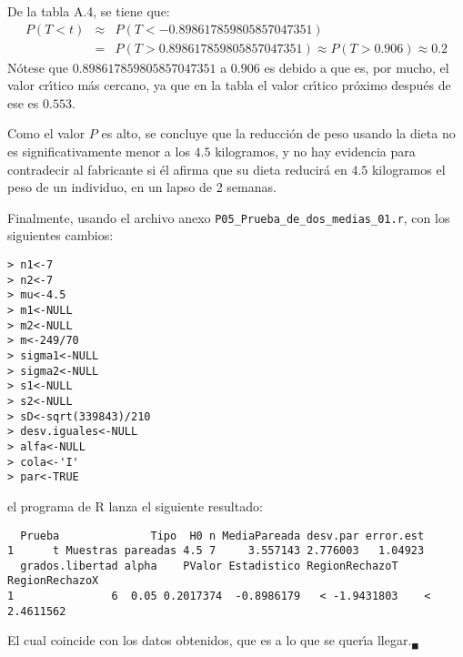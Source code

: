 \begin{solucion}
 \begin{valorp}
  De la tabla A.4, se tiene que:
  \begin{eqnarray*}
   P\left( T < t \right) & \approx & P(T < -0.898617859805857047351)
   \\
   & = & P(T > 0.898617859805857047351)
   \approx P(T>0.906) \approx 0.2
  \end{eqnarray*}
  N\'otese que $0.898617859805857047351$ a $0.906$
  es debido a que es, por mucho, el valor cr\'{\i}tico m\'as cercano,
  ya que en la tabla el valor cr\'{\i}tico pr\'oximo despu\'es
  de ese es $0.553$.
 \end{valorp}

 \begin{conclusion}
  Como el valor $P$ es alto, se concluye
  que la reducci\'on de peso usando la dieta
  no es significativamente menor a los $4.5$ kilogramos,
  y no hay evidencia para contradecir al fabricante si
  \'el afirma que su dieta reducir\'a en $4.5$ kilogramos el peso
  de un individuo, en un lapso de 2 semanas.
 \end{conclusion}

 Finalmente, usando el archivo anexo
 \texttt{P05\_Prueba\_de\_dos\_medias\_01.r},
 con los siguientes cambios:
 \begin{verbatim}
> n1<-7
> n2<-7
> mu<-4.5
> m1<-NULL
> m2<-NULL
> m<-249/70
> sigma1<-NULL
> sigma2<-NULL
> s1<-NULL
> s2<-NULL
> sD<-sqrt(339843)/210
> desv.iguales<-NULL
> alfa<-NULL
> cola<-'I'
> par<-TRUE
 \end{verbatim}
 \vspace{-0.5cm}
 el programa de R lanza el siguiente resultado:
 \begin{verbatim}
  Prueba              Tipo  H0 n MediaPareada desv.par error.est
1      t Muestras pareadas 4.5 7     3.557143 2.776003   1.04923
  grados.libertad alpha    PValor Estadistico RegionRechazoT RegionRechazoX
1               6  0.05 0.2017374  -0.8986179   < -1.9431803    < 2.4611562
 \end{verbatim}
 \vspace{-0.5cm}
 El cual coincide con los datos obtenidos,
 que es a lo que se quer\'{\i}a llegar.${}_{\blacksquare}$
\end{solucion}
